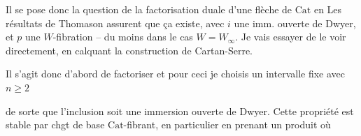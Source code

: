 Il se pose donc la question de la factorisation duale d'une flèche  de $\mathrm{Cat}$ en
  Les résultats de Thomason assurent que ça existe, avec $i$ une imm. ouverte de Dwyer, et $p$ une $W$-fibration -- du moins dans le cas $W=W_\infty$. Je vais essayer de le voir directement, en calquant  la construction  de Cartan-Serre.

Il s'agit donc d'abord de factoriser
et pour ceci je choisis un intervalle fixe
avec \qquad $n\geq 2$

de sorte que l'inclusion
soit une immersion ouverte de Dwyer. Cette propriété est stable par chgt de base $\mathrm{Cat}$-fibrant, en particulier en prenant un produit
où
